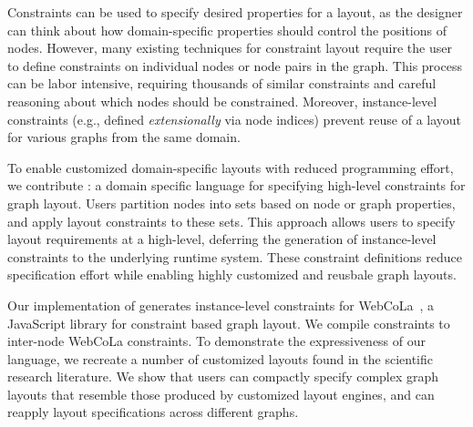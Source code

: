 Constraints can be used to specify desired properties for a layout, as the designer can think about how domain-specific properties should control the positions of nodes. However, many existing techniques
for constraint layout require the user to define constraints
on individual nodes or node pairs in the graph. This process can be labor
intensive, requiring thousands of similar constraints and careful reasoning
about which nodes should be constrained. Moreover, instance-level constraints (e.g., defined \emph{extensionally} via node indices) prevent
reuse of a layout for various graphs from the same domain.

To enable customized domain-specific layouts with reduced
programming effort, we contribute \projectname: a domain specific language for
specifying high-level constraints for graph layout. Users partition nodes
into sets based on node or graph properties, and apply layout constraints
to these sets. This approach allows users to specify layout
requirements at a high-level, deferring the generation of
instance-level constraints to the underlying runtime system. These constraint
definitions reduce specification effort while enabling highly
customized and reusbale graph layouts.

Our implementation of \projectname generates instance-level constraints for
WebCoLa~\cite{WebCoLa}, a JavaScript library for constraint based graph
layout. We compile \projectname constraints to inter-node WebCoLa constraints.
To demonstrate the expressiveness of our language, we
recreate a number of customized layouts found in the scientific research 
literature. We
show that users can compactly specify complex graph layouts that resemble
those produced by customized layout engines, and can reapply layout
specifications across different graphs.
